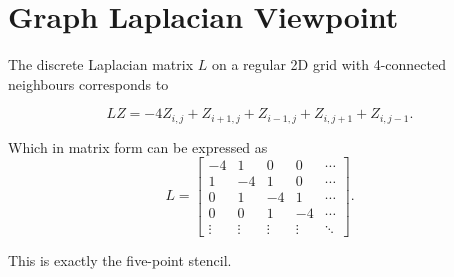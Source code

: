 \documentclass{article}
\begin{document}
\section*{Graph Laplacian Viewpoint}

The discrete Laplacian matrix \(L\) on a regular 2D grid with 4-connected neighbours corresponds to

\begin{equation}
L Z = -4Z_{i,j} + Z_{i+1,j} + Z_{i-1,j} + Z_{i,j+1} + Z_{i,j-1}.
\end{equation}

Which in matrix form can be expressed as
\begin{equation}
    L = \begin{bmatrix}
        -4 & 1 & 0 & 0 & \cdots \\
        1 & -4 & 1 & 0 & \cdots \\
        0 & 1 & -4 & 1 & \cdots \\
        0 & 0 & 1 & -4 & \cdots \\
        \vdots & \vdots & \vdots & \vdots & \ddots
    \end{bmatrix}.
\end{equation}

This is exactly the five-point stencil.
\end{document}
